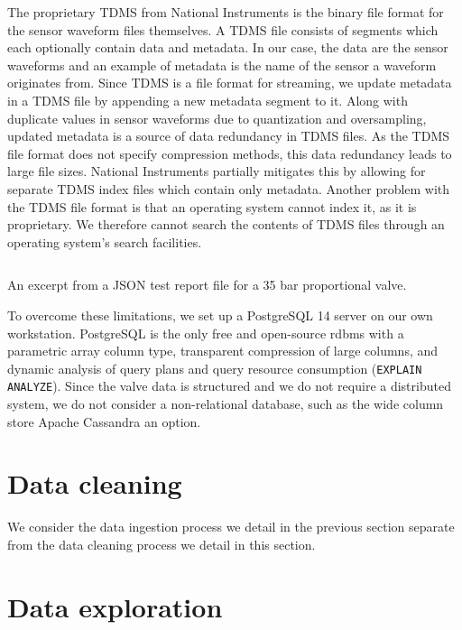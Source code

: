 The proprietary TDMS from National Instruments \citep{nitdms} is the binary file format for the sensor waveform files themselves.
A TDMS file consists of segments which each optionally contain data and metadata.
In our case, the data are the sensor waveforms and an example of metadata is the name of the sensor a waveform originates from.
Since TDMS is a file format for streaming, we update metadata in a TDMS file by appending a new metadata segment to it.
Along with duplicate values in sensor waveforms due to quantization and oversampling, updated metadata is a source of data redundancy in TDMS files.
As the TDMS file format does not specify compression methods, this data redundancy leads to large file sizes.
National Instruments partially mitigates this by allowing for separate TDMS index files which contain only metadata.
Another problem with the TDMS file format is that an operating system cannot index it, as it is proprietary.
We therefore cannot search the contents of TDMS files through an operating system's search facilities.

\begin{listing}
  \inputminted[firstline=101,lastline=124,breaklines=true]{json}{test_report.json}
  \caption{An excerpt from a JSON test report file for a 35 bar proportional valve.}
  \label{lst:test-report}
\end{listing}

To overcome these limitations, we set up a PostgreSQL 14 server on our own workstation.
PostgreSQL is the only free and open-source \acrshort{rdbms} with a parametric array column type, transparent compression of large columns, and dynamic analysis of query plans and query resource consumption (\texttt{EXPLAIN ANALYZE}).
Since the valve data is structured and we do not require a distributed system, we do not consider a non-relational database, such as the wide column store Apache Cassandra an option.

\section{Data cleaning}

We consider the data ingestion process we detail in the previous section separate from the data cleaning process we detail in this section.

\section{Data exploration}

